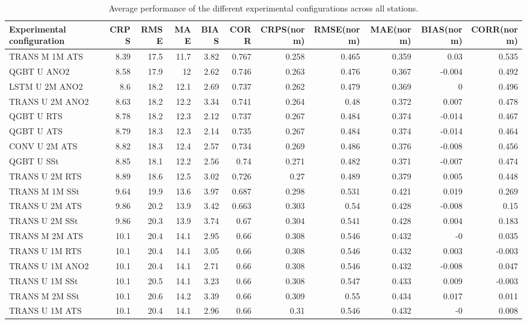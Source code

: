 \documentclass[12pt,a4paper]{book}
\begin{document}
\begin{landscape}
\begin{table}[h]
\centering

\begin{tabular}{lrrrrrrrrrr}
\toprule
Experimental configuration & CRPS & RMSE & MAE & BIAS & CORR & CRPS(norm) & RMSE(norm) & MAE(norm) & BIAS(norm) & CORR(norm) \\
\midrule
TRANS M 1M ATS & 8.39 & 17.5 & 11.7 & 3.82 & 0.767 & 0.258 & 0.465 & 0.359 & 0.03 & 0.535 \\
QGBT U ANO2 & 8.58 & 17.9 & 12 & 2.62 & 0.746 & 0.263 & 0.476 & 0.367 & -0.004 & 0.492 \\
LSTM U 2M ANO2 & 8.6 & 18.2 & 12.1 & 2.69 & 0.737 & 0.262 & 0.479 & 0.369 & 0 & 0.496 \\
TRANS U 2M ANO2 & 8.63 & 18.2 & 12.2 & 3.34 & 0.741 & 0.264 & 0.48 & 0.372 & 0.007 & 0.478 \\
QGBT U RTS & 8.78 & 18.2 & 12.3 & 2.12 & 0.737 & 0.267 & 0.484 & 0.374 & -0.014 & 0.467 \\
QGBT U ATS & 8.79 & 18.3 & 12.3 & 2.14 & 0.735 & 0.267 & 0.484 & 0.374 & -0.014 & 0.464 \\
CONV U 2M ATS & 8.82 & 18.3 & 12.4 & 2.57 & 0.734 & 0.269 & 0.486 & 0.376 & -0.008 & 0.456 \\
QGBT U SSt & 8.85 & 18.1 & 12.2 & 2.56 & 0.74 & 0.271 & 0.482 & 0.371 & -0.007 & 0.474 \\
TRANS U 2M RTS & 8.89 & 18.6 & 12.5 & 3.02 & 0.726 & 0.27 & 0.489 & 0.379 & 0.005 & 0.448 \\
TRANS M 1M SSt & 9.64 & 19.9 & 13.6 & 3.97 & 0.687 & 0.298 & 0.531 & 0.421 & 0.019 & 0.269 \\
TRANS U 2M ATS & 9.86 & 20.2 & 13.9 & 3.42 & 0.663 & 0.303 & 0.54 & 0.428 & -0.008 & 0.15 \\
TRANS U 2M SSt & 9.86 & 20.3 & 13.9 & 3.74 & 0.67 & 0.304 & 0.541 & 0.428 & 0.004 & 0.183 \\
TRANS M 2M ATS & 10.1 & 20.4 & 14.1 & 2.95 & 0.66 & 0.308 & 0.546 & 0.432 & -0 & 0.035 \\
TRANS U 1M RTS & 10.1 & 20.4 & 14.1 & 3.05 & 0.66 & 0.308 & 0.546 & 0.432 & 0.003 & -0.003 \\
TRANS U 1M ANO2 & 10.1 & 20.4 & 14.1 & 2.71 & 0.66 & 0.308 & 0.546 & 0.432 & -0.008 & 0.047 \\
TRANS U 1M SSt & 10.1 & 20.5 & 14.1 & 3.23 & 0.66 & 0.308 & 0.547 & 0.433 & 0.009 & -0.003 \\
TRANS M 2M SSt & 10.1 & 20.6 & 14.2 & 3.39 & 0.66 & 0.309 & 0.55 & 0.434 & 0.017 & 0.011 \\
TRANS U 1M ATS & 10.1 & 20.4 & 14.1 & 2.96 & 0.66 & 0.31 & 0.546 & 0.432 & -0 & 0.008 \\
\bottomrule
\end{tabular}

\caption{Average performance of the different experimental configurations across all stations.}
\label{tab:exp2b_complex1}
\end{table}

\end{landscape}
\restoregeometry
\end{document}
